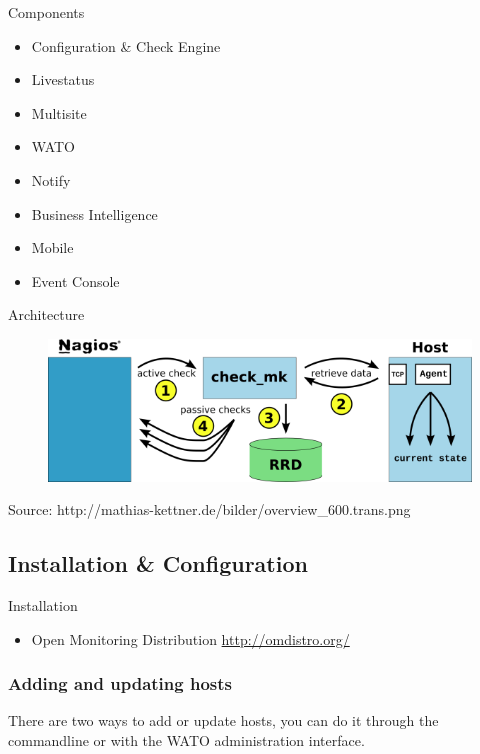\begin{frame}[fragile]{Components}
\begin{itemize}
\item Configuration \& Check Engine
\item Livestatus
\item Multisite
\item WATO
\item Notify
\item Business Intelligence
\item Mobile
\item Event Console
\end{itemize}
\end{frame}

\begin{frame}{Architecture}
\begin{figure}
\includegraphics[width=\textwidth]{images/overview_600_trans.png}
\end{figure}
Source: http://mathias-kettner.de/bilder/overview\_600.trans.png
\end{frame}

\subsection{Installation \& Configuration}

\begin{frame}[fragile]{Installation}
\begin{itemize}
\item Open Monitoring Distribution \url{http://omdistro.org/}
\end{itemize}
\end{frame}

\subsubsection{Adding and updating hosts}
There are two ways to add or update hosts, you can do
it through the commandline or with the WATO administration
interface.

